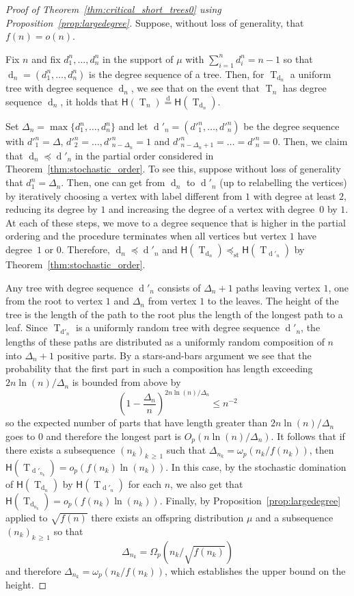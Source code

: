 \documentclass[10pt]{amsart}
\theoremstyle{definition}\newtheorem{defi}[theo]{Definition}\newtheorem{rema}[theo]{Remark}\newtheorem{exam}[theo]{Example}\newtheorem{exem}[theo]{Example}\newtheorem{nota}[theo]{Notation}
\newcommand{\height}{\mathsf{H}}
\newcommand{\sequence}[1]{\mathrm{#1}}
\DeclareMathOperator{\rtree}{T}
\DeclareMathOperator{\dseq}{d}
\DeclareMathOperator{\st}{st}
\newcommand{\eqdist}{\ensuremath{\stackrel{\mathrm{d}}{=}}}
\begin{document}
\begin{proof}[Proof of Theorem~\ref{thm:critical_short_trees0} {using Proposition~\ref{prop:largedegree}}]
Suppose, without loss of generality, that $f(n)=o(n)$.

Fix $n$ and fix $d^n_1,\dots,d^n_n$ in the support of $\mu$ with $\sum_{i=1}^nd^n_i=n-1$ so that $\dseq_n=(d^n_{1},\dots,d^n_{n})$ is the degree sequence of a tree. Then, for $\rtree_{\dseq_n}$ a uniform tree with degree sequence $\dseq_n$, we see that on the event that $\rtree_n$ has degree sequence $\dseq_n$, it holds that $\height(\rtree_n)\eqdist \height(\rtree_{\dseq_n})$.

Set $\Delta_n=\max\{d^n_1,\dots,d^n_n\}$ and let $\dseq'_n=(d'^n_1,\dots,d'^n_n)$ be the degree sequence with $d'^n_1=\Delta$, $d'^n_2=\dots,d'^n_{n-\Delta_n}=1$ and $d'^n_{n-\Delta_n+1}=\dots=d'^n_n=0$. Then, we claim that $\dseq_n\preceq \dseq'_n$ in the partial order considered in Theorem~\ref{thm:stochastic_order}. To see this, suppose without loss of generality that $d^n_1=\Delta_n$. Then, one can get from $\dseq_n$ to $\dseq'_n$ (up to relabelling the vertices) by iteratively choosing a vertex with label different from $1$ with degree at least $2$, reducing its degree by $1$ and increasing the degree of a vertex with degree~$0$ by $1$. At each of these steps, we move to a degree sequence that is higher in the partial ordering and the procedure terminates when all vertices but vertex $1$ have degree~$1$ or $0$. Therefore, $\dseq_n\preceq \dseq'_n$ and $\height(\rtree_{\dseq_n})\preceq_{\st} \height(\rtree_{\dseq'_n})$ by Theorem~\ref{thm:stochastic_order}.

Any tree with degree sequence $\dseq'_n$ consists of $\Delta_n+1$ paths leaving vertex $1$, one from the root to vertex $1$ and $\Delta_n$ from vertex $1$ to the leaves. The height of the tree is the length of the path to the root plus the length of the longest path to a leaf. Since $\rtree_{\sequence{d'}_n}$ is a uniformly random tree with degree sequence $ \dseq'_n$, the lengths of these paths are distributed as a uniformly random composition of $n$ into $\Delta_n+1$ positive parts. By a stars-and-bars argument we see that the probability that the first part in such a composition has length exceeding $2n\ln(n)/\Delta_n$ is bounded from above by
\[
\left(1-\frac{\Delta_n}{n}\right)^{2n\ln(n)/\Delta_n}\leq n^{-2}
\]
so the expected number of parts that have length greater than $2n\ln(n)/\Delta_n$ goes to $0$ and therefore the longest part is $O_p(n\ln(n)/\Delta_n)$. It follows that if there exists a subsequence $(n_k)_{k\,\geq\,1}$ such that $\Delta_{n_{k}}=\omega_p(n_k/f(n_k))$, then $\height(\rtree_{\dseq'_{n_k}})=o_p(f(n_k)\ln(n_k))$. In this case, by the stochastic domination of $\height(\rtree_{\dseq_n})$ by $\height(\rtree_{\dseq'_n})$ for each $n$, we also get that $\height(\rtree_{\dseq_{n_k}})=o_p(f(n_k)\ln(n_k))$. Finally, by Proposition~\ref{prop:largedegree} applied to $\sqrt{f(n)}$ there exists an offspring distribution $\mu$ and a subsequence $(n_k)_{k\,\geq\,1}$ so that
\[
\Delta_{n_{k}}=\Omega_p\left(n_k/\sqrt{f(n_k)}\right)
\]
and therefore $\Delta_{n_{k}}=\omega_p(n_k/f(n_k))$, which establishes the upper bound on the height.


\end{proof}
\end{document}

